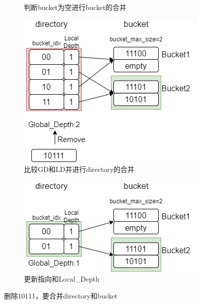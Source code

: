 \documentclass[a4paper]{article}
\begin{document}
\begin{figure}[h!]
\begin{minipage}[b]{0.4\linewidth}
\begin{subfigure}{}
       \caption{判断bucket为空进行bucket的合并}
     \end{subfigure}
   \end{minipage}%
   \begin{minipage}[b]{0.4\linewidth}
     \centering
     \begin{subfigure}{}
       \includegraphics[width=\linewidth]{15.png}
       \caption{比较GD和LD并进行directory的合并}
     \end{subfigure}
     \vfill
     \begin{subfigure}{}
       \includegraphics[width=\linewidth]{16.png}
       \caption{更新指向和Local\_Depth}
     \end{subfigure}
   \end{minipage}
   \caption{删除10111，要合并directory和bucket}
 \end{figure}
\end{document}
